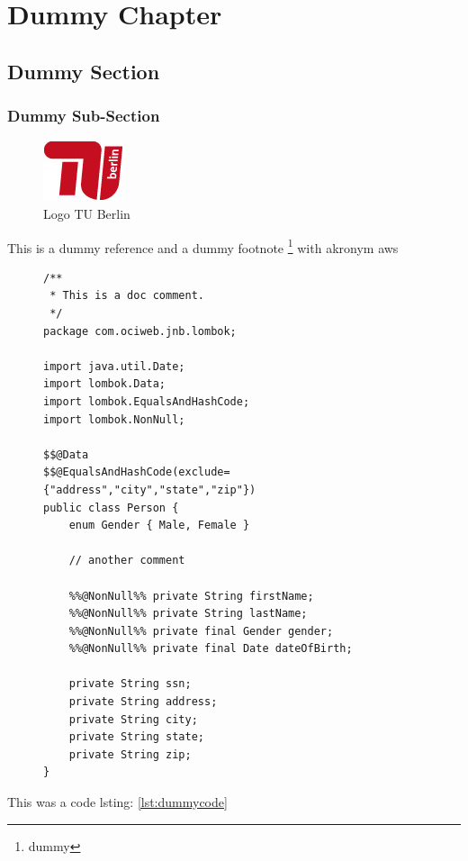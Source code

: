 \chapter{Dummy Chapter}

\section{Dummy Section}

\subsection{Dummy Sub-Section}

\begin{figure}
	\includegraphics[width=\textwidth]{figures/tu_logo.jpg}
	\caption{Logo TU Berlin}
	\label{fig:tu-logo}
\end{figure}

This is a dummy reference \cite{dummy} and a dummy footnote \footnote{dummy} with akronym \ac{aws}


\begin{figure}
\begin{center}
\begin{lstlisting}[label=lst:dummycode, caption=dummycode]
/**
 * This is a doc comment.
 */
package com.ociweb.jnb.lombok;

import java.util.Date;
import lombok.Data;
import lombok.EqualsAndHashCode;
import lombok.NonNull;

$$@Data
$$@EqualsAndHashCode(exclude={"address","city","state","zip"})
public class Person {
    enum Gender { Male, Female }

    // another comment

    %%@NonNull%% private String firstName;
    %%@NonNull%% private String lastName;
    %%@NonNull%% private final Gender gender;
    %%@NonNull%% private final Date dateOfBirth;

    private String ssn;
    private String address;
    private String city;
    private String state;
    private String zip;
}
\end{lstlisting}
\end{center}

\end{figure}

This was a code lsting: \ref{lst:dummycode} 
